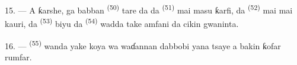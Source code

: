 15. --- A ƙarshe, ga babban 
\textsuperscript{(50)} tare da  da
 \textsuperscript{(51)} mai  masu
ƙarfi, da  \textsuperscript{(52)} mai  mai
kauri, da  \textsuperscript{(53)} biyu da
 \textsuperscript{(54)} wadda take amfani da
 cikin gwaninta.

16. ---  \textsuperscript{(55)} wanda
yake koya wa waɗannan dabbobi yana tsaye a bakin ƙofar rumfar.

\VUsaut{6.0mm}
\VUfilet{22mm}
